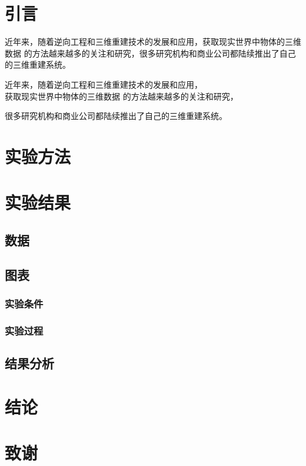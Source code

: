 \documentclass{ctexart}
\begin{document}
    \section{引言}
    近年来，随着逆向工程和三维重建技术的发展和应用，获取现实世界中物体的三维数据
    的方法越来越多的关注和研究，很多研究机构和商业公司都陆续推出了自己的三维重建系统。

    近年来，随着逆向工程和三维重建技术的发展和应用，\\获取现实世界中物体的三维数据
    的方法越来越多的关注和研究，\par 很多研究机构和商业公司都陆续推出了自己的三维重建系统。
    \section{实验方法}
    \section{实验结果}
    \subsection{数据}
    \subsection{图表}
    \subsubsection{实验条件}
    \subsubsection{实验过程}
    \subsection{结果分析}
    \section{结论}
    \section{致谢}
\end{document}
